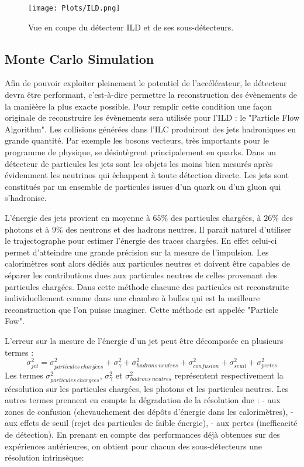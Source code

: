 \begin{figure}[H]
\centering
\texttt{[image: Plots/ILD.png]}
\caption{Vue en coupe du d\'etecteur ILD et de ses sous-d\'etecteurs.}
\label{figure:4.2}
\end{figure}

\subsection{Monte Carlo Simulation}

Afin de pouvoir exploiter pleinement le potentiel de l'acc\'el\'erateur, le d\'etecteur devra \^etre performant, c'est-\`a-dire permettre la reconstruction des \'ev\`enements de la maniè\`ere la plus exacte possible. Pour remplir cette condition une fa\c{c}on originale de reconstruire les \'ev\`enements sera utilis\'ee pour l'ILD : le "Particle Flow Algorithm". Les collisions g\'en\'er\'ees dans l'ILC produiront des jets hadroniques en grande quantit\'e. Par exemple les bosons vecteurs, tr\`es importants pour le programme de physique, se d\'esint\`egrent principalement en quarks. Dans un d\'etecteur de particules les jets sont les objets les moins bien mesur\'es apr\`es \'evidemment les neutrinos qui \'echappent \`a toute d\'etection directe. Les jets sont constitu\'es par un ensemble de particules issues d'un quark ou d'un gluon qui s'hadronise.
~\par L'\'energie des jets provient en moyenne \`a $65\%$ des particules charg\'ees, \`a $26\%$ des photons et \`a $9\%$ des neutrons et des hadrons neutres. Il parait naturel d'utiliser le trajectographe pour estimer l'\'energie des traces charg\'ees. En effet celui-ci permet d'atteindre une grande pr\'ecision sur la mesure de l'impulsion. Les calorim\`etres sont alors d\'edi\'es aux particules neutres et doivent \^etre capables de s\'eparer les contributions dues aux particules neutres de celles provenant des particules charg\'ees. Dans cette m\'ethode chacune des particules est reconstruite individuellement comme dans une chambre \`a bulles qui est la meilleure reconstruction que l'on puisse imaginer. Cette m\'ethode est appel\'ee "Particle Fow".
~\par L'erreur sur la mesure de l'\'energie d'un jet peut \^etre d\'ecompos\'ee en plusieurs termes :
$${\sigma}_{jet}^{2}={\sigma}_{particules\ charg\acute{e}es}^{2}+{\sigma}_{\gamma}^{2}+{\sigma}_{hadrons\ neutres}^{2}+{\sigma}_{confusion}^{2}+{\sigma}_{seuil}^{2}+{\sigma}_{pertes}^{2}$$
Les termes ${\sigma}_{particules\ charg\acute{e}es}^{2}$, ${\sigma}_{\gamma}^{2}$ et ${\sigma}_{hadrons\ neutres}^{2}$ représentent respectivement la r\'eesolution sur les particules charg\'ees, les photons et les particules neutres. Les autres termes prennent en compte la d\'egradation de la r\'esolution due : - aux zones de confusion (chevauchement des d\'ep\^ots d'\'energie dans les calorim\`etres), - aux effets de seuil (rejet des particules de faible \'energie), - aux pertes (inefficacit\'e de d\'etection). En prenant en compte des performances d\'ej\`a obtenues sur des exp\'eriences ant\'erieures, on obtient pour chacun des sous-d\'etecteurs une r\'esolution intrins\`eque:
